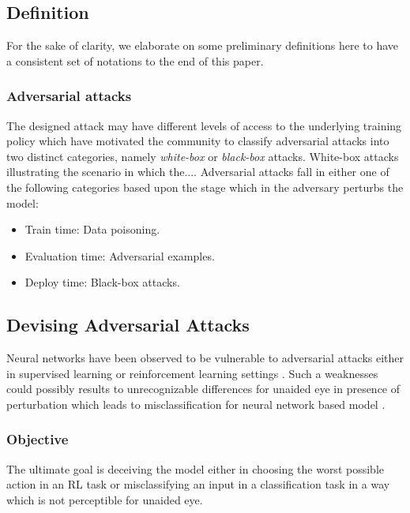 \documentclass[letterpaper,12pt]{article}
\begin{document}
    \subsection{Definition}
    For the sake of clarity, we elaborate on some preliminary definitions here to have a consistent set of notations to the end of this paper.

    \subsubsection{Adversarial attacks}
    The designed attack may have different levels of access to the underlying training policy which have motivated the community to classify adversarial attacks into two distinct categories, namely \textit{white-box} or \textit{black-box} attacks. White-box attacks illustrating the scenario in which the.... Adversarial attacks fall in either one of the following categories based upon the stage which in the adversary perturbs the model:
    \begin{itemize}
        \item Train time: Data poisoning.
        \item Evaluation time: Adversarial examples.
        \item Deploy time: Black-box attacks.
    \end{itemize}


    \subsection{Devising Adversarial Attacks}
    Neural networks have been observed to be vulnerable to adversarial attacks either in supervised learning or reinforcement learning settings \cite{Huang2017}. Such a weaknesses could possibly results to unrecognizable differences for unaided eye in presence of perturbation which leads to misclassification for neural network based model \cite{Szegedy2014, Goodfellow2014}.

    \subsubsection{Objective}
    The ultimate goal is deceiving the model either in choosing the worst possible action in an RL task or misclassifying an input in a classification task in a way which is not perceptible for unaided eye.
\end{document}

